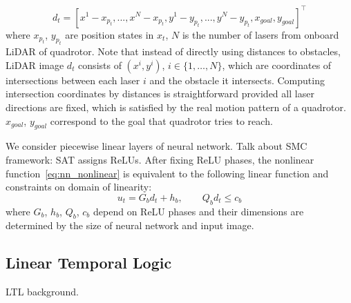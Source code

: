\begin{equation}
    \label{eq:image}
    d_t = [x^1-x_{p_t},..., x^N-x_{p_t}, y^1-y_{p_t},..., y^N-y_{p_t}, x_{goal}, y_{goal}]^\intercal
\end{equation}
where $x_{p_t}$, $y_{p_t}$ are position states in $x_t$,
$N$ is the number of lasers from onboard LiDAR of quadrotor. 
Note that instead of directly using distances to obstacles, LiDAR image $d_t$ consists of $(x^i, y^i)$, 
$i\in\{1,\ldots,N\}$, which are coordinates of intersections between each laser $i$ and the obstacle it intersects.
Computing intersection coordinates by distances is straightforward provided all laser directions are fixed, 
which is satisfied by the real motion pattern of a quadrotor. $x_{goal}$, $y_{goal}$ correspond to the goal 
that quadrotor tries to reach.


We consider piecewise linear layers of neural network.
{\color{blue} Talk about SMC framework: SAT assigns ReLUs.}
After fixing ReLU phases, the nonlinear function~\eqref{eq:nn_nonlinear} is equivalent to the following linear function 
and constraints on domain of linearity:
\begin{equation}
    \label{eq:nn_linear}  
    u_t =  G_b d_t + h_b, \qquad Q_b d_t \le c_b
\end{equation}
where $G_b$, $h_b$, $Q_b$, $c_b$ depend on ReLU phases and their dimensions are determined by the size of neural network and input image.


\subsection{Linear Temporal Logic}

{\color{blue} LTL background.}



